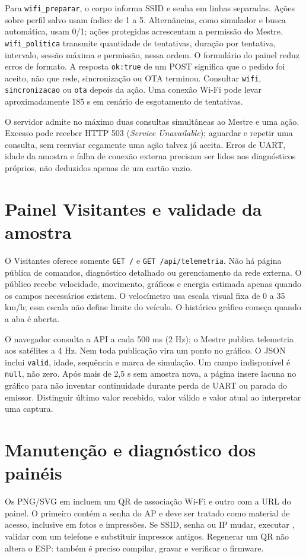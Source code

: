 Para \texttt{wifi\_preparar}, o corpo informa SSID e senha em linhas separadas. Ações sobre perfil salvo usam índice de 1 a 5. Alternâncias, como simulador e busca automática, usam 0/1; ações protegidas acrescentam a permissão do Mestre. \texttt{wifi\_politica} transmite quantidade de tentativas, duração por tentativa, intervalo, sessão máxima e permissão, nessa ordem. O formulário do painel reduz erros de formato. A resposta \texttt{ok:true} de um POST significa que o pedido foi aceito, não que rede, sincronização ou OTA terminou. Consultar \texttt{wifi}, \texttt{sincronizacao} ou \texttt{ota} depois da ação. Uma conexão Wi-Fi pode levar aproximadamente 185 s em cenário de esgotamento de tentativas.

O servidor admite no máximo duas consultas simultâneas ao Mestre e uma ação. Excesso pode receber HTTP 503 (\emph{Service Unavailable}); aguardar e repetir uma consulta, sem reenviar cegamente uma ação talvez já aceita. Erros de UART, idade da amostra e falha de conexão externa precisam ser lidos nos diagnósticos próprios, não deduzidos apenas de um cartão vazio.

\section{Painel Visitantes e validade da amostra}\label{sec:painel-visitantes}
O Visitantes oferece somente \texttt{GET /} e \texttt{GET /api/telemetria}. Não há página pública de comandos, diagnóstico detalhado ou gerenciamento da rede externa. O público recebe velocidade, movimento, gráficos e energia estimada apenas quando os campos necessários existem. O velocímetro usa escala visual fixa de 0 a 35 km/h; essa escala não define limite do veículo. O histórico gráfico começa quando a aba é aberta.

O navegador consulta a API a cada 500 ms (2 Hz); o Mestre publica telemetria aos satélites a 4 Hz. Nem toda publicação vira um ponto no gráfico. O JSON inclui \texttt{valid}, idade, sequência e marca de simulação. Um campo indisponível é \texttt{null}, não zero. Após mais de 2,5 s sem amostra nova, a página insere lacuna no gráfico para não inventar continuidade durante perda de UART ou parada do emissor. Distinguir último valor recebido, valor válido e valor atual ao interpretar uma captura.

\section{Manutenção e diagnóstico dos painéis}\label{sec:qr-paineis}
Os PNG/SVG em  incluem um QR de associação Wi-Fi e outro com a URL do painel. O primeiro contém a senha do AP e deve ser tratado como material de acesso, inclusive em fotos e impressões. Se SSID, senha ou IP mudar, executar , validar com um telefone e substituir impressos antigos. Regenerar um QR não altera o ESP: também é preciso compilar, gravar e verificar o firmware.

